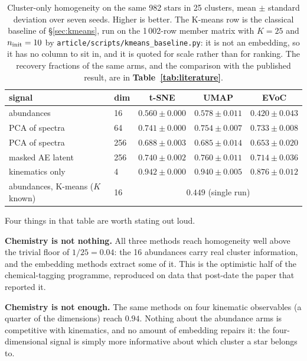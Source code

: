 \begin{table}[htbp]
\centering
\small
{}
\begin{tabular}{@{}llccc@{}}
\toprule
signal & dim & t-SNE & UMAP & EVoC \\
\midrule
abundances                & 16  & $0.560 \pm 0.000$ & $0.578 \pm 0.011$ & $0.420 \pm 0.043$ \\
PCA of spectra            & 64  & $0.741 \pm 0.000$ & $0.754 \pm 0.007$ & $0.733 \pm 0.008$ \\
PCA of spectra            & 256 & $0.688 \pm 0.003$ & $0.685 \pm 0.014$ & $0.653 \pm 0.020$ \\
masked AE latent          & 256 & $0.740 \pm 0.002$ & $0.760 \pm 0.011$ & $0.714 \pm 0.036$ \\
kinematics only           & 4   & $0.942 \pm 0.000$ & $0.940 \pm 0.005$ & $0.876 \pm 0.012$ \\
\midrule
abundances, K-means ($K$ known) & 16 & \multicolumn{3}{c}{$0.449$ (single run)} \\
\bottomrule
\end{tabular}
\caption{Cluster-only homogeneity on the same 982 stars in 25 clusters, mean
$\pm$ standard deviation over seven seeds. Higher is better. The K-means row
is the classical baseline of \S\ref{sec:kmeans}, run on the 1\,002-row
member matrix with $K=25$ and $n_{\rm init}=10$ by
\texttt{article/scripts/kmeans\_baseline.py}: it is not an embedding, so it
has no column to sit in, and it is quoted for scale rather than for ranking.
The recovery fractions of the same arms, and the comparison with the published
result, are in \textbf{Table~\ref{tab:literature}}.}
\label{tab:honest}
\end{table}

Four things in that table are worth stating out loud.

\textbf{Chemistry is not nothing.} All three methods reach homogeneity well
above the trivial floor of $1/25 = 0.04$: the 16 abundances carry real cluster
information, and the embedding methods extract some of it. This is the
optimistic half of the chemical-tagging programme, reproduced on data that
post-date the paper that reported it.

\textbf{Chemistry is not enough.} The same methods on four kinematic
observables (a quarter of the dimensions) reach $0.94$. Nothing about the
abundance arms is competitive with kinematics, and no amount of embedding
repairs it: the four-dimensional signal is simply more informative about which
cluster a star belongs to.

